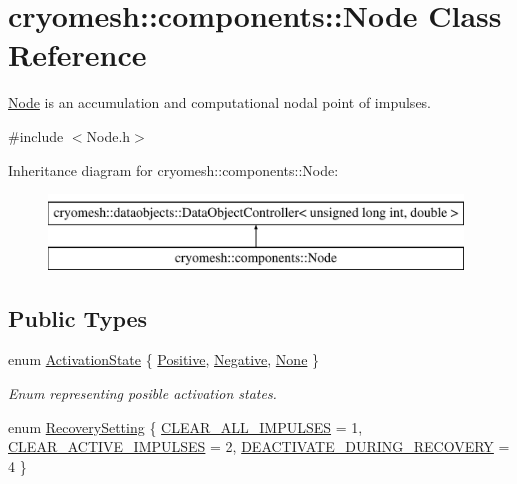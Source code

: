 \hypertarget{classcryomesh_1_1components_1_1Node}{\section{cryomesh\-:\-:components\-:\-:\-Node \-Class \-Reference}
\label{classcryomesh_1_1components_1_1Node}
}


\hyperlink{classcryomesh_1_1components_1_1Node}{\-Node} is an accumulation and computational nodal point of impulses.  




{\ttfamily \#include $<$\-Node.\-h$>$}

\-Inheritance diagram for cryomesh\-:\-:components\-:\-:\-Node\-:\begin{figure}[H]
\begin{center}
\leavevmode
\includegraphics[height=2.000000cm]{classcryomesh_1_1components_1_1Node}
\end{center}
\end{figure}
\subsection*{\-Public \-Types}
\begin{DoxyCompactItemize}
\item 
enum \hyperlink{classcryomesh_1_1components_1_1Node_a291becdd589b5bd338d5c0dd28199798}{\-Activation\-State} \{ \hyperlink{classcryomesh_1_1components_1_1Node_a291becdd589b5bd338d5c0dd28199798af92c268dc627d5fed69c32d6f0d3d82e}{\-Positive}, 
\hyperlink{classcryomesh_1_1components_1_1Node_a291becdd589b5bd338d5c0dd28199798ab3953601aa3c39f46155bba156a29fb6}{\-Negative}, 
\hyperlink{classcryomesh_1_1components_1_1Node_a291becdd589b5bd338d5c0dd28199798a4b7d78598441d7b9fd51e7bb58415f4b}{\-None}
 \}
\begin{DoxyCompactList}\small\item\em \-Enum representing posible activation states. \end{DoxyCompactList}\item 
enum \hyperlink{classcryomesh_1_1components_1_1Node_adf36d853022d1b106766aefd3b9f3641}{\-Recovery\-Setting} \{ \hyperlink{classcryomesh_1_1components_1_1Node_adf36d853022d1b106766aefd3b9f3641a91a2a1e92850c99a22afb1574bd74574}{\-C\-L\-E\-A\-R\-\_\-\-A\-L\-L\-\_\-\-I\-M\-P\-U\-L\-S\-E\-S} =  1, 
\hyperlink{classcryomesh_1_1components_1_1Node_adf36d853022d1b106766aefd3b9f3641a000e55e803e043c412dfbc2d222a34e6}{\-C\-L\-E\-A\-R\-\_\-\-A\-C\-T\-I\-V\-E\-\_\-\-I\-M\-P\-U\-L\-S\-E\-S} =  2, 
\hyperlink{classcryomesh_1_1components_1_1Node_adf36d853022d1b106766aefd3b9f3641a3d8ee8e0f92053fa06eaa4184f1854b1}{\-D\-E\-A\-C\-T\-I\-V\-A\-T\-E\-\_\-\-D\-U\-R\-I\-N\-G\-\_\-\-R\-E\-C\-O\-V\-E\-R\-Y} =  4
 \}
\end{DoxyCompactItemize}
